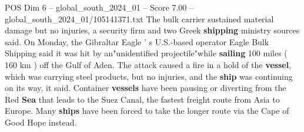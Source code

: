\begin{textsample}{POS Dim 6 – global\_south\_2024\_01 – Score 7.00 – global\_south\_2024\_01/105141371.txt}
The bulk carrier sustained material damage but no injuries, a security firm and two Greek \textbf{shipping} ministry sources said.
On Monday, the Gibraltar Eagle ' s U.S.-based operator Eagle Bulk Shipping said it was hit by an"unidentified projectile"while \textbf{sailing} 100 miles ( 160 km ) off the Gulf of Aden.
The attack caused a fire in a hold of the \textbf{vessel}, which was carrying steel products, but no injuries, and the \textbf{ship} was continuing on its way, it said.
Container \textbf{vessels} have been pausing or diverting from the Red \textbf{Sea} that leads to the Suez Canal, the fastest freight route from Asia to Europe.
Many \textbf{ships} have been forced to take the longer route via the Cape of Good Hope instead.

\end{textsample}

